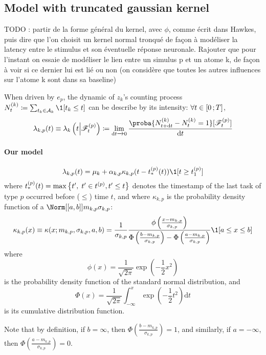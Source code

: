 \subsection{Model with truncated gaussian kernel}

TODO : partir de la forme général du kernel, avec $\phi$, comme écrit dans Hawkes, puis dire que l'on choisit un kernel normal tronqué de façon à modéliser la latency entre le stimulus et son éventuelle réponse neuronale.
Rajouter que pour l'instant on essaie de modéliser le lien entre un simulus p et un atome k, de façon à voir si ce dernier lui est lié ou non (on considère que toutes les autres influences sur l'atome k sont dans sa baseline)

When driven by $e_p$, the dynamic of $z_k$'s counting process $N_t^{(k)} \coloneqq \sum_{t_k \in \mathcal{A}_k} \1[t_k \leq t]$ can be describe by its intensity: $\forall t\in\left[ 0 \, ; T \right]$,
\begin{equation}\label{eq:intensity_definition}
    \lambda_{k,p}(t) \equiv \lambda_{k}\pars{t \middle| \mathscr{F}_t^{(p)}} \coloneqq \lim_{\dint t \xrightarrow{} 0 }\frac{\proba{N_{t+\dint t}^{(k)} - N_t^{(k)} = 1}[\mathscr{F}_t^{(p)}]}{\dint t}
\end{equation}

\paragraph{Our model}
\begin{equation}\label{eq:model_intensity}
    \lambda_{k,p}(t)  = \mu_k + \alpha_{k,p}\kappa_{k,p}(t - t_*^{(p)}(t))\1[t \geq t_1^{(p)}]
\end{equation}
where $t_*^{(p)}(t) = \max\left\lbrace t',\; t' \in t^{(p)}, t' \leq t \right\rbrace$ denotes the timestamp of the last task of type $p$ occurred before ($\leq$) time $t$, and where $\kappa_{k,p}$ is the probability density function of a $\Norm[\bracks{a,b}]{m_{k,p}}{\sigma_{k,p}}$:
\begin{equation}\label{eq:kernel_trunc_norm}
    \kappa_{k,p}(x) \equiv \kappa(x ; m_{k,p}, \sigma_{k,p}, a, b)=\frac{1}{\sigma_{k,p}} \frac{\phi\left(\frac{x-m_{k,p}}{\sigma_{k,p}}\right)}{\Phi\left(\frac{b-m_{k,p}}{\sigma_{k,p}}\right)-\Phi\left(\frac{a-m_{k,p}}{\sigma_{k,p}}\right)} \1[a\leq x\leq b]
\end{equation}
where
$$
\phi(x) = \frac{1}{\sqrt{2\pi}}\exp\left(-\frac{1}{2}x^2\right)
$$ 
is the probability density function of the standard normal distribution, and
$$
\Phi(x) = \frac{1}{\sqrt{2\pi}} \int_{-\infty}^x \exp\left(-\frac{1}{2}t^2\right) \mathrm{d}t
$$
is its cumulative distribution function.

Note that by definition, if $b=\infty$, then $\Phi\left(\frac{b-m_{k,p}}{\sigma_{k,p}}\right) = 1$, and similarly, if $a=-\infty$, then $\Phi\left(\frac{a-m_{k,p}}{\sigma_{k,p}}\right) = 0$.